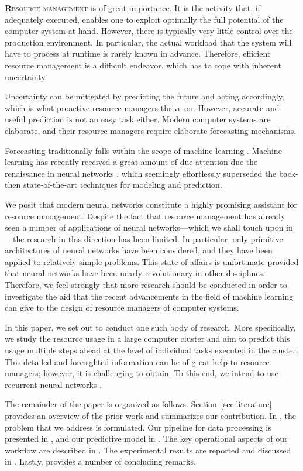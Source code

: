\lettrine[findent=0.2em, nindent=0em]{\textbf{R}}{esource management} is of
great importance. It is the activity that, if adequately executed, enables one
to exploit optimally the full potential of the computer system at hand. However,
there is typically very little control over the production environment. In
particular, the actual workload that the system will have to process at runtime
is rarely known in advance. Therefore, efficient resource management is a
difficult endeavor, which has to cope with inherent uncertainty.

Uncertainty can be mitigated by predicting the future and acting accordingly,
which is what proactive resource managers thrive on. However, accurate and
useful prediction is not an easy task either. Modern computer systems are
elaborate, and their resource managers require elaborate forecasting mechanisms.

Forecasting traditionally falls within the scope of machine learning
\cite{hastie2009}. Machine learning has recently received a great amount of due
attention due the renaissance in neural networks \cite{goodfellow2016}, which
seemingly effortlessly superseded the back-then state-of-the-art techniques for
modeling and prediction.

We posit that modern neural networks constitute a highly promising assistant for
resource management. Despite the fact that resource management has already seen
a number of applications of neural networks---which we shall touch upon in
---the research in this direction has been limited. In
particular, only primitive architectures of neural networks have been
considered, and they have been applied to relatively simple problems. This state
of affairs is unfortunate provided that neural networks have been nearly
revolutionary in other disciplines. Therefore, we feel strongly that more
research should be conducted in order to investigate the aid that the recent
advancements in the field of machine learning can give to the design of resource
managers of computer systems.

In this paper, we set out to conduct one such body of research. More
specifically, we study the resource usage in a large computer cluster and aim to
predict this usage multiple steps ahead at the level of individual tasks
executed in the cluster. This detailed and foresighted information can be of
great help to resource managers; however, it is challenging to obtain. To this
end, we intend to use recurrent neural networks \cite{goodfellow2016}.

The remainder of the paper is organized as follows. Section~\ref{sec:literature}
provides an overview of the prior work and summarizes our contribution. In
, the problem that we address is formulated. Our pipeline for data
processing is presented in , and our predictive model in
. The key operational aspects of our workflow are described in
. The experimental results are reported and discussed in
. Lastly,  provides a number of concluding
remarks.
